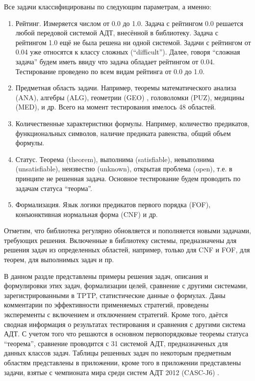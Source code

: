 Все задачи классифицированы по следующим параметрам, а именно:
\begin{enumerate}
\item {Рейтинг.} Измеряется числом от 0.0 до 1.0. Задача с рейтингом 0.0 решается любой передовой системой АДТ, внесённой в библиотеку. Задача с рейтингом 1.0 ещё не была решена ни одной системой. Задачи с рейтингом от 0.04 уже относятся к классу сложных (``difficult''). Далее, говоря ``сложная задача'' будем иметь ввиду что задача обладает рейтингом от 0.04. Тестирование проведено по всем видам рейтинга от 0.0 до 1.0.
\item {Предметная область задачи.} Например, теоремы математического анализа (ANA), алгебры (ALG), геометрии (GEO) \cite{constrgeo}, головоломки (PUZ), медицины (MED), и др. Всего на момент тестирования имелось 48 областей.
\item {Количественные характеристики формулы.} Например, количество предикатов, функциональных символов, наличие предиката равенства, общий объем формулы.
\item {Статус.} Теорема (theorem), выполнима (satisfiable), невыполнима (unsatisfiable), неизвестно (unknown), открытая проблема (open), т.е. в принципе не решенная задача. Основное тестирование будем проводить по задачам статуса ``теорма''.
\item {Формализация.} Язык логики предикатов первого порядка (FOF), конъюнктивная нормальная форма (CNF) и др.
\end{enumerate}

Отметим, что библиотека регулярно обновляется и пополняется новыми задачами, требующих решения. Включенные в библиотеку системы, предназначены для решения задач из определенных областей, например, только для CNF и FOF, для теорем, для выполнимых задач и пр.

В данном раздле представлены примеры решения задач, описания и формулировки этих задач, формализации целей, сравнение с другими системами, зарегистрированными в TPTP, статистические данные о формулах. Даны комментарии по эффективности применяемых стратегий, проведены эксперементы с включением и отключением стратегий. Кроме того, даётся сводная информация о результатах тестирования и сравнения с другими система АДТ. С учетом того что решаются в основном первопорядковые теоремы статуса ``теорема'', сравнение проводится с 31 системой АДТ, предназначеных для данных классов задач. Таблицы решенных задач по некоторым предметным областям представлены в приложении, кроме того в приложении представлены задачи, взятые с чемпионата мира среди систем АДТ 2012 (CASC-J6) \cite{CASC}.



